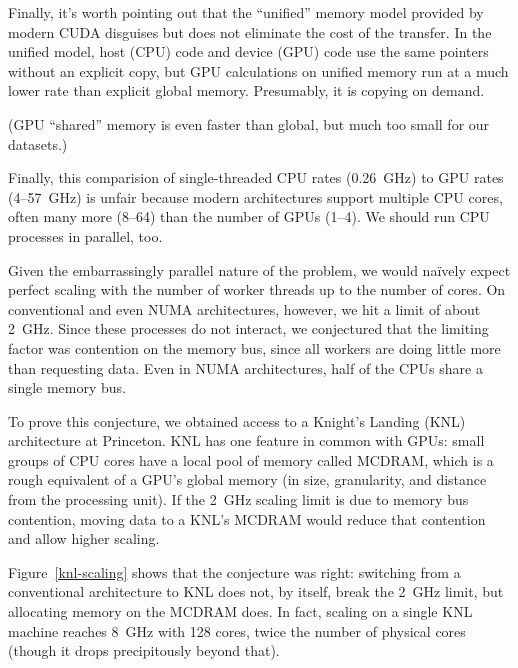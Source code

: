 \documentclass[12pt]{article}
\begin{document}
Finally, it's worth pointing out that the ``unified'' memory model provided by modern CUDA disguises but does not eliminate the cost of the transfer. In the unified model, host (CPU) code and device (GPU) code use the same pointers without an explicit copy, but GPU calculations on unified memory run at a much lower rate than explicit global memory. Presumably, it is copying on demand.

(GPU ``shared'' memory is even faster than global, but much too small for our datasets.)

Finally, this comparision of single-threaded CPU rates (0.26~GHz) to GPU rates (4--57~GHz) is unfair because modern architectures support multiple CPU cores, often many more (8--64) than the number of GPUs (1--4). We should run CPU processes in parallel, too.

Given the embarrassingly parallel nature of the problem, we would na\"ively expect perfect scaling with the number of worker threads up to the number of cores. On conventional and even NUMA architectures, however, we hit a limit of about 2~GHz. Since these processes do not interact, we conjectured that the limiting factor was contention on the memory bus, since all workers are doing little more than requesting data. Even in NUMA architectures, half of the CPUs share a single memory bus.

To prove this conjecture, we obtained access to a Knight's Landing (KNL) architecture at Princeton. KNL has one feature in common with GPUs: small groups of CPU cores have a local pool of memory called MCDRAM, which is a rough equivalent of a GPU's global memory (in size, granularity, and distance from the processing unit). If the 2~GHz scaling limit is due to memory bus contention, moving data to a KNL's MCDRAM would reduce that contention and allow higher scaling.

Figure~\ref{knl-scaling} shows that the conjecture was right: switching from a conventional architecture to KNL does not, by itself, break the 2~GHz limit, but allocating memory on the MCDRAM does. In fact, scaling on a single KNL machine reaches 8~GHz with 128 cores, twice the number of physical cores (though it drops precipitously beyond that).
\end{document}
